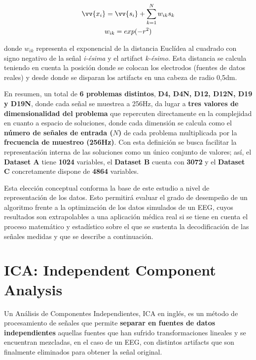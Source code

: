 \begin{equation}\label{eq:D12-9}
	\begin{gathered}
	\vv{x_i} = \vv{s_i} + \sum_{k=1}^{N} w_{ik} s_k\\
	w_{ik} = exp (-r^2)
	\end{gathered}
\end{equation}

donde $w_{ik}$ representa el exponencial de la distancia Euclídea al cuadrado con signo negativo de la señal \textit{i-ésima} y el artifact \textit{k-ésimo}. Esta distancia se calcula teniendo en cuenta la posición donde se colocan los electrodos (fuentes de datos reales) y desde donde se disparan los artifacts en una cabeza de radio 0,5dm.

En resumen, un total de \textbf{6 problemas distintos}, \textbf{D4, D4N, D12, D12N, D19 y D19N}, donde cada señal se muestrea a 256Hz, da lugar a \textbf{tres valores de dimensionalidad del problema} que repercuten directamente en la complejidad en cuanto a espacio de soluciones, donde cada dimensión se calcula como el \textbf{número de señales de entrada ($N$)} de cada problema multiplicada por la \textbf{frecuencia de muestreo (256Hz)}. Con esta definición se busca facilitar la representación interna de las soluciones como un único conjunto de valores; así, el \textbf{Dataset A} tiene \textbf{1024} variables, el \textbf{Dataset B} cuenta con \textbf{3072} y el \textbf{Dataset C} concretamente dispone de \textbf{4864} variables.

Esta elección conceptual conforma la base de este estudio a nivel de representación de los datos. Esto permitirá evaluar el grado de desempeño de un algoritmo frente a la optimización de los datos simulados de un EEG, cuyos resultados son extrapolables a una aplicación médica real si se tiene en cuenta el proceso matemático y estadístico sobre el que se sustenta la decodificación de las señales medidas y que se describe a continuación.

\section{ICA: Independent Component Analysis}

Un Análisis de Componentes Independientes, ICA en inglés, es un método de procesamiento de señales que permite \textbf{separar en fuentes de datos independientes} aquellas fuentes que han sufrido transformaciones lineales y se encuentran mezcladas, en el caso de un EEG, con distintos artifacts que son finalmente eliminados para obtener la señal original\cite{ICA4Dummies}.

